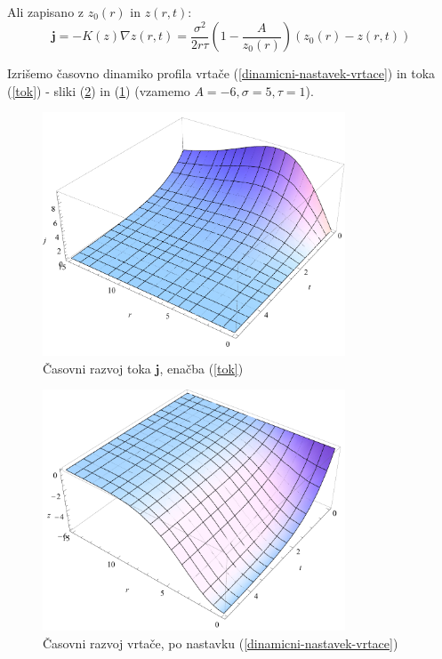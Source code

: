 \documentclass[a4paper, oneside, 12pt]{book}
\begin{document}
        Ali zapisano z $z_0(r)$ in $z(r,t)$:
        \begin{equation}
          \mathbf{j} = - K(z) \nabla z(r,t) = \frac{\sigma^2}{2 r \tau} \left(1- \frac{A}{z_0(r)}\right) (z_0(r)-z(r,t))
        \end{equation}


        Izrišemo časovno dinamiko profila vrtače (\ref{dinamicni-nastavek-vrtace}) in toka (\ref{tok}) - sliki (\ref{fig:vrtaca-dinamicno}) in (\ref{fig:tok-dinamicno}) (vzamemo $A=-6,\sigma=5,\tau = 1$).

        \begin{figure}[H]
          \begin{center}
            \includegraphics[width=9cm]{slike/tok-dinamicno}
          \end{center}
          \caption{Časovni razvoj toka $\mathbf{j}$, enačba (\ref{tok})}
          \label{fig:tok-dinamicno}
        \end{figure}

        \begin{figure}[H]
          \begin{center}
            \includegraphics[width=9cm]{slike/vrtaca-dinamicno}
          \end{center}
          \caption{Časovni razvoj vrtače, po nastavku (\ref{dinamicni-nastavek-vrtace})}
          \label{fig:vrtaca-dinamicno}
        \end{figure}
\end{document}
